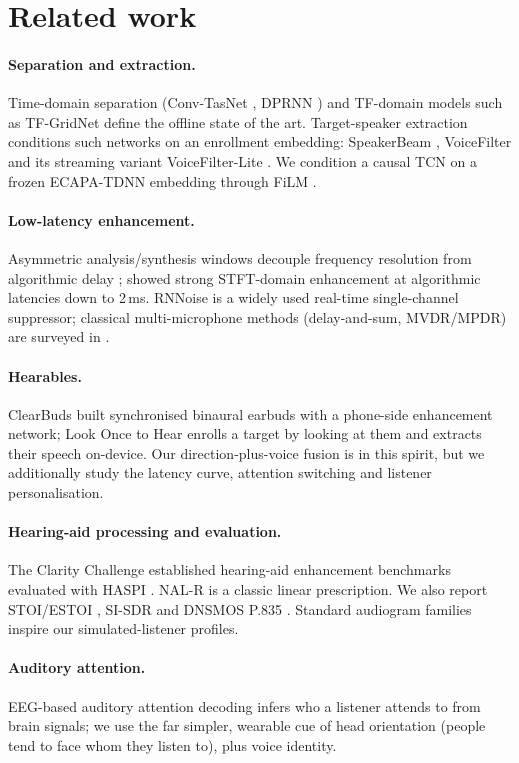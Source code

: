 \section{Related work}
\paragraph{Separation and extraction.} Time-domain separation (Conv-TasNet \citep{luo2019convtasnet},
DPRNN \citep{luo2020dprnn}) and TF-domain models such as TF-GridNet \citep{wang2023tfgridnet} define
the offline state of the art. Target-speaker extraction conditions such networks on an enrollment
embedding: SpeakerBeam \citep{zmolikova2019speakerbeam}, VoiceFilter \citep{wang2019voicefilter} and
its streaming variant VoiceFilter-Lite \citep{wang2020voicefilterlite}. We condition a causal TCN on a
frozen ECAPA-TDNN embedding \citep{desplanques2020ecapa} through FiLM \citep{perez2018film}.
\paragraph{Low-latency enhancement.} Asymmetric analysis/synthesis windows decouple frequency
resolution from algorithmic delay \citep{mauler2007lowdelay}; \citet{wang2023lowlatency} showed strong
STFT-domain enhancement at algorithmic latencies down to 2\,ms. RNNoise \citep{valin2018rnnoise} is a
widely used real-time single-channel suppressor; classical multi-microphone methods (delay-and-sum,
MVDR/MPDR) are surveyed in \citep{gannot2017consolidated}.
\paragraph{Hearables.} ClearBuds \citep{chatterjee2022clearbuds} built synchronised binaural earbuds
with a phone-side enhancement network; Look Once to Hear \citep{veluri2024lookonce} enrolls a target by
looking at them and extracts their speech on-device. Our direction-plus-voice fusion is in this spirit,
but we additionally study the latency curve, attention switching and listener personalisation.
\paragraph{Hearing-aid processing and evaluation.} The Clarity Challenge \citep{graetzer2021clarity}
established hearing-aid enhancement benchmarks evaluated with HASPI
\citep{kates2014haspi,kates2021haspiv2}. NAL-R \citep{byrne1986nal} is a classic linear prescription.
We also report STOI/ESTOI \citep{taal2011stoi,jensen2016estoi}, SI-SDR \citep{leroux2019sisdr} and
DNSMOS P.835 \citep{reddy2022dnsmos}. Standard audiogram families \citep{bisgaard2010audiograms} inspire
our simulated-listener profiles.
\paragraph{Auditory attention.} EEG-based auditory attention decoding \citep{osullivan2015aad} infers
who a listener attends to from brain signals; we use the far simpler, wearable cue of head orientation
(people tend to face whom they listen to), plus voice identity.
